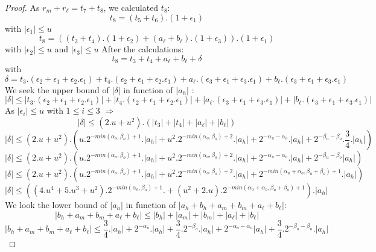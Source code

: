 \begin{proof}
As $r_m + r_{\ell} = t_7 + t_8$, we calculated $t_8$:
$$t_8 = (t_5 + t_6).(1+\epsilon_1)$$
with $\lvert \epsilon_1 \rvert \le u$
$$t_8 = ((t_3+t_4).(1+\epsilon_2) + (a_{\ell}+b_{\ell}).(1+ \epsilon_3)).(1+\epsilon_1)$$
with $\lvert \epsilon_2 \rvert \le u$ and 
$\lvert \epsilon_3 \rvert \le u$
After the calculations:
$$t_8 = t_3 + t_4 + a_{\ell} + b_{\ell} + \delta$$
with $\delta = t_3.(\epsilon_2 + \epsilon_1 + \epsilon_2.\epsilon_1) + t_4.(\epsilon_2 + \epsilon_1 + \epsilon_2.\epsilon_1) + a_{\ell}.(\epsilon_3 + \epsilon_1 + \epsilon_3.\epsilon_1) + b_{\ell}.(\epsilon_3 + \epsilon_1 + \epsilon_3.\epsilon_1) $\\
We seek the upper bound of $\lvert \delta \rvert$ in function of $\lvert a_h \rvert$ :
$$ \lvert \delta \rvert \le \lvert t_3.(\epsilon_2 + \epsilon_1 + \epsilon_2.\epsilon_1) \rvert + \lvert t_4.(\epsilon_2 + \epsilon_1 + \epsilon_2.\epsilon_1) \rvert + \lvert a_{\ell}.(\epsilon_3 + \epsilon_1 + \epsilon_3.\epsilon_1) \rvert + \lvert b_{\ell}.(\epsilon_3 + \epsilon_1 + \epsilon_3.\epsilon_1) \rvert$$
As $\lvert \epsilon_i \rvert \le u$ with $1\le i \le 3$ $\Rightarrow$
$$ \lvert \delta \rvert \le (2.u + u^2).(\lvert t_3 \rvert + \lvert t_4\rvert + \lvert a_{\ell} \rvert + \lvert b_{\ell} \rvert)$$
$$ \lvert \delta \rvert \le (2.u + u^2).(u.2^{-min(\alpha_o,\beta_o)+1}. \lvert a_h \rvert + u^2. 2^{-min(\alpha_o,\beta_o)+2}. \lvert a_h \rvert + 2^{-\alpha_u -\alpha_o} .\lvert a_h \rvert + 2^{-\beta_u -\beta_o}.\frac{3}{4} .\lvert a_h \rvert)$$
$$ \lvert \delta \rvert \le (2.u + u^2).(u.2^{-min(\alpha_o,\beta_o)+1}. \lvert a_h \rvert + u^2. 2^{-min(\alpha_o,\beta_o)+2}. \lvert a_h \rvert + 2^{-\alpha_u -\alpha_o} .\lvert a_h \rvert + 2^{-\beta_u -\beta_o}\lvert a_h \rvert)$$
$$ \lvert \delta \rvert \le (2.u + u^2).(u.2^{-min(\alpha_o,\beta_o)+1}. \lvert a_h \rvert + u^2. 2^{-min(\alpha_o,\beta_o)+2}. \lvert a_h \rvert + 2^{-min(\alpha_u +\alpha_o,\beta_u +\beta_o)+1} .\lvert a_h \rvert)$$
$$ \lvert \delta \rvert \le ((4.u^4 + 5.u^3+ u^2).2^{-min(\alpha_o,\beta_o)+1}.  + (u^2+2.u).2^{-min(\alpha_u +\alpha_o,\beta_u +\beta_o)+1} ).\lvert a_h \rvert$$
We look the lower bound of $\lvert a_h \rvert $ in function of $\lvert a_h +b_h + a_m +b_m + a_{\ell} + b_{\ell} \rvert$:
$$\lvert b_h + a_m +b_m + a_{\ell} + b_{\ell} \rvert \le \lvert b_h \rvert + \lvert a_m \rvert + \lvert b_m \rvert + \lvert a_{\ell} \rvert + \lvert b_{\ell} \rvert$$
$$\lvert b_h + a_m +b_m + a_{\ell} + b_{\ell} \rvert \le \frac{3}{4}.\lvert a_h \rvert + 2^{-\alpha_o}.\lvert a_h \rvert + \frac{3}{4}.2^{-\beta_o}.\lvert a_h \rvert + 2^{-\alpha_o-\alpha_u}\lvert a_h \rvert + \frac{3}{4}.2^{-\beta_o - \beta_u}.\lvert a_h \rvert$$

\end{proof}
